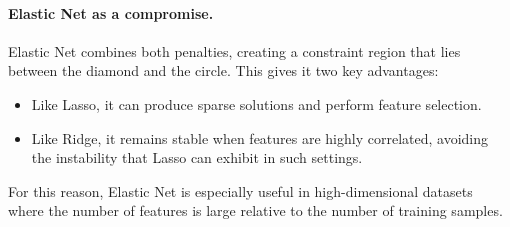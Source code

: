 \documentclass{article}
\newcommand{\vecb}[1]{\boldsymbol{#1}} %
\newcommand{\matb}[1]{\mathbf{#1}}     %
\newcommand{\vb}[1]{\mathbf{#1}}       %
\begin{document}
\paragraph{Elastic Net as a compromise.}
Elastic Net combines both penalties, creating a constraint region that lies between the diamond and the circle. This gives it two key advantages:

\begin{itemize}
    \item Like Lasso, it can produce sparse solutions and perform feature selection.
    \item Like Ridge, it remains stable when features are highly correlated, avoiding the instability that Lasso can exhibit in such settings.
\end{itemize}

For this reason, Elastic Net is especially useful in high-dimensional datasets where the number of features is large relative to the number of training samples.










\end{document}

